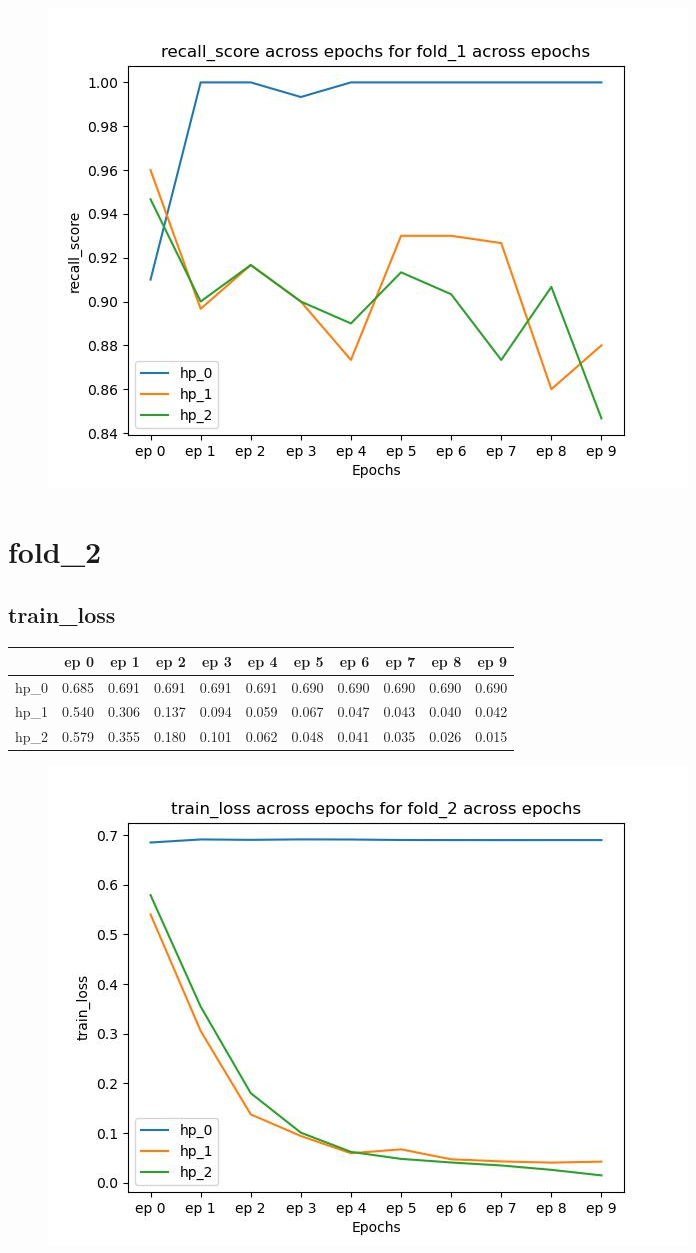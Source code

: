 \documentclass{article}
\begin{document}
\begin{figure}[H]
\includegraphics[scale = 0.75]{fold_1/recall_score}
\end{figure}
\section{fold\_2}
\subsection{train\_loss}
\begin{tabular}{lrrrrrrrrrr}
\toprule
{} &   ep 0 &   ep 1 &   ep 2 &   ep 3 &   ep 4 &   ep 5 &   ep 6 &   ep 7 &   ep 8 &   ep 9 \\
\midrule
hp\_0 &  0.685 &  0.691 &  0.691 &  0.691 &  0.691 &  0.690 &  0.690 &  0.690 &  0.690 &  0.690 \\
hp\_1 &  0.540 &  0.306 &  0.137 &  0.094 &  0.059 &  0.067 &  0.047 &  0.043 &  0.040 &  0.042 \\
hp\_2 &  0.579 &  0.355 &  0.180 &  0.101 &  0.062 &  0.048 &  0.041 &  0.035 &  0.026 &  0.015 \\
\bottomrule
\end{tabular}

\begin{figure}[H]
\includegraphics[scale = 0.75]{fold_2/train_loss}
\end{figure}
\end{document}
